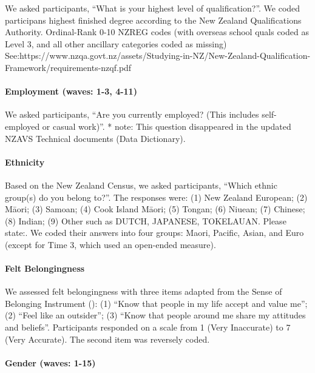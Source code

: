 \documentclass[
  singlecolumn]{article}
\let\oldparagraph\paragraph
\renewcommand{\paragraph}[1]{\oldparagraph{#1}\mbox{}}
\begin{document}
We asked participants, ``What is your highest level of qualification?''.
We coded participans highest finished degree according to the New
Zealand Qualifications Authority. Ordinal-Rank 0-10 NZREG codes (with
overseas school quals coded as Level 3, and all other ancillary
categories coded as missing)
See:https://www.nzqa.govt.nz/assets/Studying-in-NZ/New-Zealand-Qualification-Framework/requirements-nzqf.pdf

\paragraph{Employment (waves: 1-3,
4-11)}\label{employment-waves-1-3-4-11}

We asked participants, ``Are you currently employed? (This includes
self-employed or casual work)''. * note: This question disappeared in
the updated NZAVS Technical documents (Data Dictionary).

\paragraph{Ethnicity}\label{ethnicity}

Based on the New Zealand Census, we asked participants, ``Which ethnic
group(s) do you belong to?''. The responses were: (1) New Zealand
European; (2) Māori; (3) Samoan; (4) Cook Island Māori; (5) Tongan; (6)
Niuean; (7) Chinese; (8) Indian; (9) Other such as DUTCH, JAPANESE,
TOKELAUAN. Please state:. We coded their answers into four groups:
Maori, Pacific, Asian, and Euro (except for Time 3, which used an
open-ended measure).

\paragraph{Felt Belongingness}\label{felt-belongingness}

We assessed felt belongingness with three items adapted from the Sense
of Belonging Instrument (): (1) ``Know that people in my life accept and value me''; (2)
``Feel like an outsider''; (3) ``Know that people around me share my
attitudes and beliefs''. Participants responded on a scale from 1 (Very
Inaccurate) to 7 (Very Accurate). The second item was reversely coded.

\paragraph{Gender (waves: 1-15)}\label{gender-waves-1-15}
\end{document}
